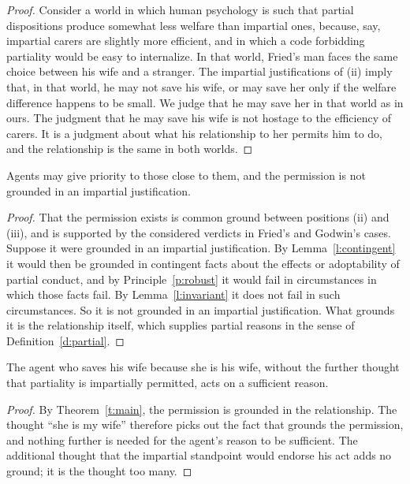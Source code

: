 \documentclass{situationist-preprint}
\begin{document}
\begin{proof}
Consider a world in which human psychology is such that partial dispositions produce somewhat less welfare than impartial ones, because, say, impartial carers are slightly more efficient, and in which a code forbidding partiality would be easy to internalize. In that world, Fried's man faces the same choice between his wife and a stranger. The impartial justifications of (ii) imply that, in that world, he may not save his wife, or may save her only if the welfare difference happens to be small. We judge that he may save her in that world as in ours. The judgment that he may save his wife is not hostage to the efficiency of carers. It is a judgment about what his relationship to her permits him to do, and the relationship is the same in both worlds.
\end{proof}

\begin{theorem}\label{t:main}
Agents may give priority to those close to them, and the permission is not grounded in an impartial justification.
\end{theorem}

\begin{proof}
That the permission exists is common ground between positions (ii) and (iii), and is supported by the considered verdicts in Fried's and Godwin's cases. Suppose it were grounded in an impartial justification. By Lemma~\ref{l:contingent} it would then be grounded in contingent facts about the effects or adoptability of partial conduct, and by Principle~\ref{p:robust} it would fail in circumstances in which those facts fail. By Lemma~\ref{l:invariant} it does not fail in such circumstances. So it is not grounded in an impartial justification. What grounds it is the relationship itself, which supplies partial reasons in the sense of Definition~\ref{d:partial}.
\end{proof}

\begin{corollary}\label{c:thought}
The agent who saves his wife because she is his wife, without the further thought that partiality is impartially permitted, acts on a sufficient reason.
\end{corollary}

\begin{proof}
By Theorem~\ref{t:main}, the permission is grounded in the relationship. The thought \enquote{she is my wife} therefore picks out the fact that grounds the permission, and nothing further is needed for the agent's reason to be sufficient. The additional thought that the impartial standpoint would endorse his act adds no ground; it is the thought too many.
\end{proof}
\end{document}
